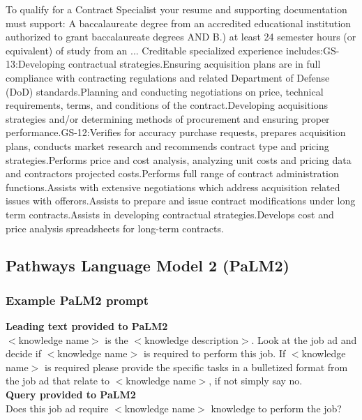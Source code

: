 \documentclass[12pt]{article}
\begin{document}
To qualify for a Contract Specialist your resume and supporting documentation must support: A baccalaureate degree from an accredited educational institution authorized to grant baccalaureate degrees AND B.) at least 24 semester hours (or equivalent) of study from an ... Creditable specialized experience includes:GS-13:Developing contractual strategies.Ensuring acquisition plans are in full compliance with contracting regulations and related Department of Defense (DoD) standards.Planning and conducting negotiations on price, technical requirements, terms, and conditions of the contract.Developing acquisitions strategies and/or determining methods of procurement and ensuring proper performance.GS-12:Verifies for accuracy purchase requests, prepares acquisition plans, conducts market research and recommends contract type and pricing strategies.Performs price and cost analysis, analyzing unit costs and pricing data and contractors projected costs.Performs full range of contract administration functions.Assists with extensive negotiations which address acquisition related issues with offerors.Assists to prepare and issue contract modifications under long term contracts.Assists in developing contractual strategies.Develops cost and price analysis spreadsheets for long-term contracts.

\newpage

\subsection{Pathways Language Model 2 (PaLM2)}

\subsubsection{Example PaLM2 prompt}\label{sec:palm_prompt}

\textbf{Leading text provided to PaLM2}\\

\noindent $<$knowledge name$>$ is the $<$knowledge description$>$. Look at the job ad and decide if $<$knowledge name$>$ is required to perform this job. If $<$knowledge name$>$ is required please provide the specific tasks in a bulletized format from the job ad that relate to $<$knowledge name$>$, if not simply say no.\\

\noindent \textbf{Query provided to PaLM2}\\

\noindent Does this job ad require $<$knowledge name$>$ knowledge to perform the job?
\end{document}
